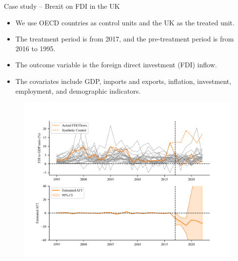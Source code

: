 \documentclass{beamer}
\begin{document}
\begin{frame}{Case study -- Brexit on FDI in the UK}
\footnotesize
\begin{itemize}
    \item We use OECD countries as control units and the UK as the treated unit.
    \item The treatment period is from 2017, and the pre-treatment period is from 2016 to 1995.
    \item The outcome variable is the foreign direct investment (FDI) inflow.
    \item The covariates include GDP, imports and exports, inflation, investment, employment, and demographic indicators.
\end{itemize}
\begin{figure}
    \centering
    \includegraphics[scale=0.5]{figs/ukfdi_ipca.png}
\end{figure}
\end{frame}
\end{document}
